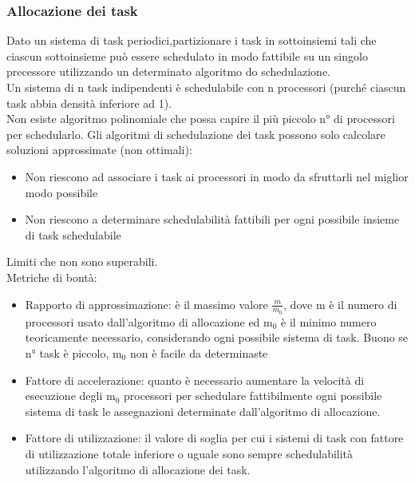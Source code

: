 \documentclass[12pt, oneside]{extbook}
\begin{document}
\subsubsection{Allocazione dei task}
Dato un sistema di task periodici,partizionare i task in sottoinsiemi tali che ciascun sottoinsieme può essere schedulato in modo fattibile su un singolo precessore utilizzando un determinato algoritmo do schedulazione.\\Un sistema di n task indipendenti è schedulabile con n processori (purché ciascun task abbia densità inferiore ad 1).\\ Non esiste algoritmo polinomiale che possa capire il più piccolo n° di processori per schedularlo. Gli algoritmi di schedulazione dei task possono solo calcolare soluzioni approssimate (non ottimali):
\begin{itemize}
\item Non riescono ad associare i task ai processori in modo da sfruttarli nel miglior modo possibile
\item Non riescono a determinare schedulabilità fattibili per ogni possibile insieme di task schedulabile
\end{itemize}
Limiti che non sono superabili.\\ Metriche di bontà:
\begin{itemize}
\item Rapporto di approssimazione: è il massimo valore $\frac{m}{m_0}$, dove m è il numero di processori usato dall'algoritmo di allocazione ed m$_{0}$ è  il minimo numero teoricamente necessario, considerando ogni possibile sistema di task. Buono se n° task è piccolo, m$_{0}$ non è facile da determinaste
\item Fattore di accelerazione: quanto è necessario aumentare la velocità di esecuzione degli m$_{0}$ processori per schedulare fattibilmente ogni possibile sistema di task le assegnazioni determinate dall'algoritmo di allocazione.
\item Fattore di utilizzazione: il valore di soglia per cui i sistemi di task con fattore di utilizzazione totale inferiore o uguale sono sempre schedulabilità utilizzando l'algoritmo di allocazione dei task.
\end{itemize}
\end{document}
